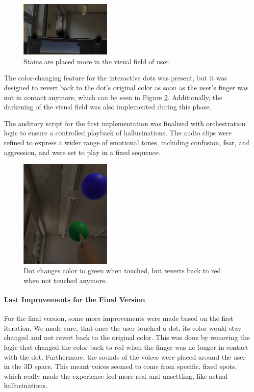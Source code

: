 \begin{figure}[H]
    \centering
    \includegraphics[width=0.4\textwidth]{../../Figures/stains-placed.png}
    \caption{Stains are placed more in the visual field of user.}
    \label{fig:stains_placed}
\end{figure}

The color-changing feature for the interactive dots was present, but it was designed to revert back to the dot's original color as soon as the user's finger was not in contact anymore, which can be seen in Figure \ref{fig:dot-green}. Additionally, the darkening of the visual field was also implemented during this phase.

\vspace{1em}

The auditory script for the first implementation was finalized with orchestration logic to ensure a controlled playback of hallucinations. The audio clips were refined to express a wider range of emotional tones, including confusion, fear, and aggression, and were set to play in a fixed sequence.

\begin{figure}[htbp]
    \centering
    \includegraphics[width=0.4\textwidth]{../../Figures/dot-color-green.png}
    \caption{Dot changes color to green when touched, but reverts back to red when not touched anymore.}
    \label{fig:dot-green}
\end{figure}

\paragraph{Last Improvements for the Final Version}
For the final version, some more improvements were made based on the first iteration. We made sure, that once the user touched a dot, its color would stay changed and not revert back to the original color. This was done by removing the logic that changed the color back to red when the finger was no longer in contact with the dot. Furthermore, the sounds of the voices were placed around the user in the 3D space. This meant voices seemed to come from specific, fixed spots, which really made the experience feel more real and unsettling, like actual hallucinations.

